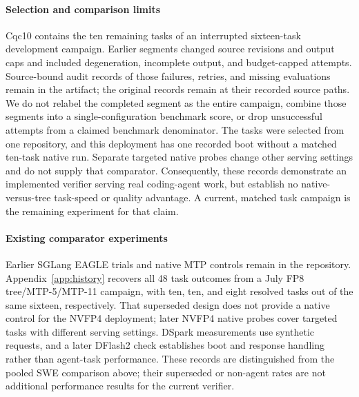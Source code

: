 \paragraph{Selection and comparison limits}
Cqc10 contains the ten remaining tasks of an interrupted sixteen-task development campaign. Earlier segments changed source revisions and output caps and included degeneration, incomplete output, and budget-capped attempts. Source-bound audit records of those failures, retries, and missing evaluations remain in the artifact; the original records remain at their recorded source paths. We do not relabel the completed segment as the entire campaign, combine those segments into a single-configuration benchmark score, or drop unsuccessful attempts from a claimed benchmark denominator. The tasks were selected from one repository, and this deployment has one recorded boot without a matched ten-task native run. Separate targeted native probes change other serving settings and do not supply that comparator. Consequently, these records demonstrate an implemented verifier serving real coding-agent work, but establish no native-versus-tree task-speed or quality advantage. A current, matched task campaign is the remaining experiment for that claim.


\paragraph{Existing comparator experiments}
Earlier SGLang EAGLE trials and native MTP controls remain in the repository. Appendix~\ref{app:history} recovers all 48 task outcomes from a July FP8 tree/MTP-5/MTP-11 campaign, with ten, ten, and eight resolved tasks out of the same sixteen, respectively. That superseded design does not provide a native control for the NVFP4 deployment; later NVFP4 native probes cover targeted tasks with different serving settings. DSpark measurements use synthetic requests, and a later DFlash2 check establishes boot and response handling rather than agent-task performance. These records are distinguished from the pooled SWE comparison above; their superseded or non-agent rates are not additional performance results for the current verifier.
